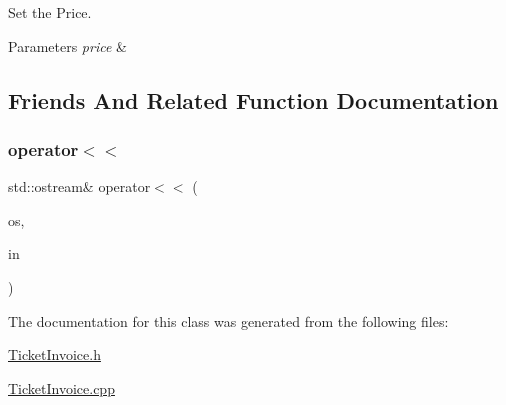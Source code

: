 Set the Price. 


\begin{DoxyParams}{Parameters}
{\em price} & \\
\hline
\end{DoxyParams}


\subsection{Friends And Related Function Documentation}
\mbox{\label{classTicketInvoice_ae78ba81ba79ed7e8c9e8cd23a910f00d}} 
\subsubsection{\texorpdfstring{operator$<$$<$}{operator<<}}
{\footnotesize\ttfamily std\+::ostream\& operator$<$$<$ (\begin{DoxyParamCaption}\item[{std\+::ostream \&}]{os,  }\item[{\mbox{\hyperlink{classTicketInvoice}{Ticket\+Invoice}} \&}]{in }\end{DoxyParamCaption})\hspace{0.3cm}{\ttfamily [friend]}}



The documentation for this class was generated from the following files\+:\begin{DoxyCompactItemize}
\item 
\mbox{\hyperlink{TicketInvoice_8h}{Ticket\+Invoice.\+h}}\item 
\mbox{\hyperlink{TicketInvoice_8cpp}{Ticket\+Invoice.\+cpp}}\end{DoxyCompactItemize}
